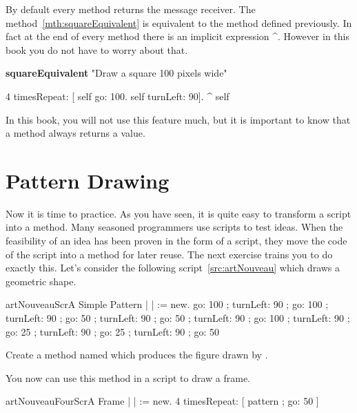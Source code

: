 By default every method returns the message receiver. The method~\ref{mth:squareEquivalent} is equivalent to the method  defined previously. In fact at the end of every method there is an implicit expression \^ \self. However in this book you do not have to worry about that. 

\begin{method}\label{mth:squareEquivalent}
\textbf{squareEquivalent}
   "Draw a square 100 pixels wide"
   
   4 timesRepeat: 
              [ self go: 100.
              self turnLeft: 90].
   ^ self
\end{method}

In this book, you will not use this feature much, but it is important to know that a method always returns a value. 

\section{Pattern Drawing}\label{sec:newart}
Now it is time to practice. As you have seen, it is quite easy to transform a script into a method.  Many seasoned programmers use scripts to test ideas. When the feasibility of an idea has been proven in the form of a script, they move the code of the script into a method for later reuse. The next exercise trains you to do exactly this.
Let's consider the following script~\ref{src:artNouveau} which draws a geometric shape. 

\begin{scriptfig}{artNouveauScr}{A Simple Pattern}\label{src:artNouveau}
| \caro |
\caro := \Turtle new.
\caro go: 100 ;
        turnLeft: 90 ;
        go: 100 ;
        turnLeft: 90 ;
        go: 50 ;
        turnLeft: 90 ;
        go: 50 ;
        turnLeft: 90 ;
        go: 100 ;
        turnLeft: 90 ;
        go: 25 ;
        turnLeft: 90 ;
        go: 25 ;
        turnLeft: 90 ;
        go: 50
\end{scriptfig}

\begin{exonofig} \label{exo:artNouveau}
Create a method named  which produces the figure drawn by .
\end{exonofig}

You now can use this method in a script to draw a frame.
\begin{scriptfig}{artNouveauFourScr}{A Frame} 
\label{src:artNouveauFrame}
| \caro |
\caro := \Turtle new.
4 timesRepeat: [ \caro pattern ; go: 50 ]
\end{scriptfig}

